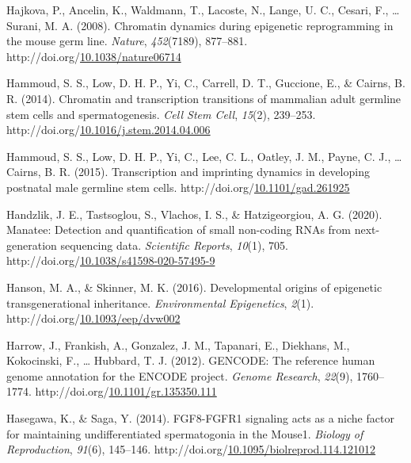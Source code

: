 \documentclass[12pt,twoside]{reedthesis}
\newlength{\cslhangindent}
\newenvironment{CSLReferences}[2] %
 {%
  \setlength{\parindent}{0pt}
  \ifodd #1 \everypar{\setlength{\hangindent}{\cslhangindent}}\ignorespaces\fi
  \ifnum #2 > 0
  \setlength{\parskip}{#2\baselineskip}
  \fi
 }%
 {}
\begin{document}
\begin{CSLReferences}{1}{0}
\leavevmode{}%
Hajkova, P., Ancelin, K., Waldmann, T., Lacoste, N., Lange, U. C., Cesari, F., \ldots{} Surani, M. A. (2008). Chromatin dynamics during epigenetic reprogramming in the mouse germ line. \emph{Nature}, \emph{452}(7189), 877--881. http://doi.org/\href{https://doi.org/10.1038/nature06714}{10.1038/nature06714}

\leavevmode{}%
Hammoud, S. S., Low, D. H. P., Yi, C., Carrell, D. T., Guccione, E., \& Cairns, B. R. (2014). Chromatin and transcription transitions of mammalian adult germline stem cells and spermatogenesis. \emph{Cell Stem Cell}, \emph{15}(2), 239--253. http://doi.org/\href{https://doi.org/10.1016/j.stem.2014.04.006}{10.1016/j.stem.2014.04.006}

\leavevmode{}%
Hammoud, S. S., Low, D. H. P., Yi, C., Lee, C. L., Oatley, J. M., Payne, C. J., \ldots{} Cairns, B. R. (2015). Transcription and imprinting dynamics in developing postnatal male germline stem cells. http://doi.org/\href{https://doi.org/10.1101/gad.261925}{10.1101/gad.261925}

\leavevmode{}%
Handzlik, J. E., Tastsoglou, S., Vlachos, I. S., \& Hatzigeorgiou, A. G. (2020). Manatee: Detection and quantification of small non-coding RNAs from next-generation sequencing data. \emph{Scientific Reports}, \emph{10}(1), 705. http://doi.org/\href{https://doi.org/10.1038/s41598-020-57495-9}{10.1038/s41598-020-57495-9}

\leavevmode{}%
Hanson, M. A., \& Skinner, M. K. (2016). Developmental origins of epigenetic transgenerational inheritance. \emph{Environmental Epigenetics}, \emph{2}(1). http://doi.org/\href{https://doi.org/10.1093/eep/dvw002}{10.1093/eep/dvw002}

\leavevmode{}%
Harrow, J., Frankish, A., Gonzalez, J. M., Tapanari, E., Diekhans, M., Kokocinski, F., \ldots{} Hubbard, T. J. (2012). GENCODE: The reference human genome annotation for the ENCODE project. \emph{Genome Research}, \emph{22}(9), 1760--1774. http://doi.org/\href{https://doi.org/10.1101/gr.135350.111}{10.1101/gr.135350.111}

\leavevmode{}%
Hasegawa, K., \& Saga, Y. (2014). FGF8-FGFR1 signaling acts as a niche factor for maintaining undifferentiated spermatogonia in the Mouse1. \emph{Biology of Reproduction}, \emph{91}(6), 145--146. http://doi.org/\href{https://doi.org/10.1095/biolreprod.114.121012}{10.1095/biolreprod.114.121012}


\end{CSLReferences}
\end{document}
